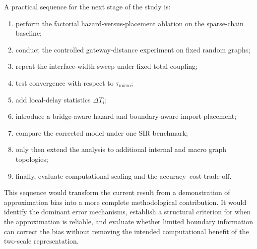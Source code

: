 \documentclass[12pt,a4paper]{article}
\begin{document}
A practical sequence for the next stage of the study is:
\begin{enumerate}
    \item perform the factorial hazard-versus-placement ablation on the sparse-chain baseline;
    \item conduct the controlled gateway-distance experiment on fixed random graphs;
    \item repeat the interface-width sweep under fixed total coupling;
    \item test convergence with respect to \(\tau_{\mathrm{micro}}\);
    \item add local-delay statistics \(\Delta T_i\);
    \item introduce a bridge-aware hazard and boundary-aware import placement;
    \item compare the corrected model under one SIR benchmark;
    \item only then extend the analysis to additional internal and macro graph topologies;
    \item finally, evaluate computational scaling and the accuracy--cost trade-off.
\end{enumerate}

This sequence would transform the current result from a demonstration of approximation bias into a more complete methodological contribution. It would identify the dominant error mechanisms, establish a structural criterion for when the approximation is reliable, and evaluate whether limited boundary information can correct the bias without removing the intended computational benefit of the two-scale representation.
\end{document}

